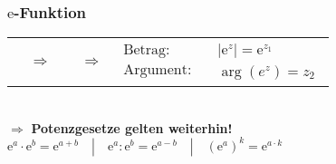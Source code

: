 				\subsubsection{$\mathrm{e}$-Funktion}
					\begin{tabular}{cccccc}
						\fbox{$\mathrm{e}^{\mathrm{j} \varphi}=\cos (\varphi)+\mathrm{j} \sin (\varphi)=\operatorname{cjs}(\varphi)$} 
						&
						$\Rightarrow$
						&
						\fbox{$\begin{aligned} \mathrm{e}^{z} &=\mathrm{e}^{z_{1}+\mathrm{j} z_{2}} \\ &=\mathrm{e}^{z_{1}} \cdot \mathrm{e}^{\mathrm{j} z_{2}} \\ &=\mathrm{e}^{z_{1}} \cdot \mathrm{c} \mathrm{j} \mathrm{s}\left(z_{2}\right) \end{aligned}$}
						&
						$\Rightarrow$
						&
						$\begin{array}{l}
							\text{Betrag:}\\
							\text{Argument}:
						\end{array}$
						&
						$\begin{array}{l}
							\left|\mathrm{e}^{z}\right|=\mathrm{e}^{z_{1}}\\
							\arg \left(e^{z}\right)=z_{2}
						\end{array}$
					\end{tabular}\\
					$\Rightarrow$ \textbf{Potenzgesetze gelten weiterhin!}\\[3pt]
					$\mathrm{e}^{a} \cdot \mathrm{e}^{b}=\mathrm{e}^{a+b} \quad\left|\quad \mathrm{e}^{a}: \mathrm{e}^{b}=\mathrm{e}^{a-b} \quad\right| \quad\left(\mathrm{e}^{a}\right)^{k}=\mathrm{e}^{a \cdot k}$
				
